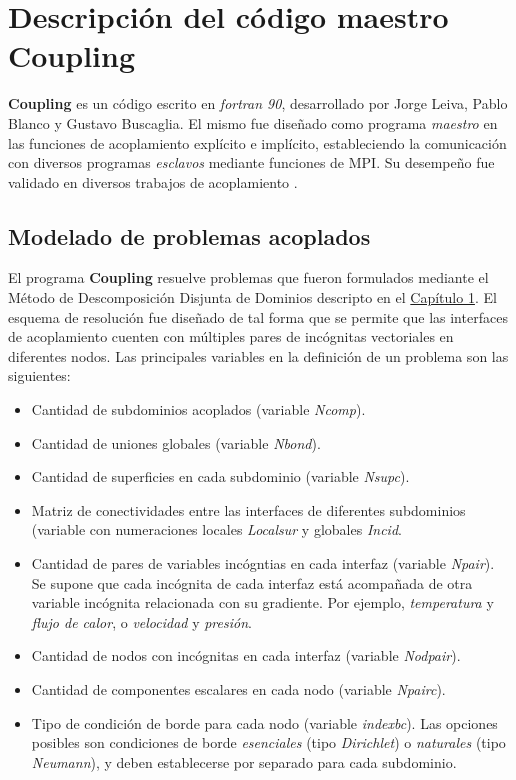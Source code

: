 \chapter{Descripción del código maestro \textbf{Coupling}}
\label{C:coupling}

\textbf{Coupling} es un código escrito en \textit{fortran 90}, desarrollado por Jorge Leiva, Pablo Blanco y Gustavo Buscaglia.
El mismo fue diseñado como programa \textit{maestro} en las funciones de acoplamiento explícito e implícito,
estableciendo la comunicación con diversos programas \textit{esclavos} mediante funciones de MPI.
Su desempeño fue validado en diversos trabajos de acoplamiento \cite{coup-0d3d} \cite{coup-black} \cite{coup-hyd} \cite{coup-strong}.

\section{Modelado de problemas acoplados}
\label{ap1:definicion}
El programa \textbf{Coupling} resuelve problemas que fueron formulados mediante el Método de Descomposición Disjunta de Dominios descripto en el \hyperlink{chapter.1}{Capítulo 1}.
El esquema de resolución fue diseñado de tal forma que se permite que las interfaces de acoplamiento cuenten con múltiples pares de incógnitas vectoriales en diferentes nodos.
Las principales variables en la definición de un problema son las siguientes:
\begin{itemize}
\item Cantidad de subdominios acoplados (variable \textit{Ncomp}).
\item Cantidad de uniones globales (variable \textit{Nbond}).
\item Cantidad de superficies en cada subdominio (variable \textit{Nsupc}).
\item Matriz de conectividades entre las interfaces de diferentes subdominios (variable con numeraciones locales \textit{Localsur} y globales \textit{Incid}.
\item Cantidad de pares de variables incógntias en cada interfaz (variable \textit{Npair}).
Se supone que cada incógnita de cada interfaz está acompañada de otra variable incógnita relacionada con su gradiente.
Por ejemplo, \textit{temperatura} y \textit{flujo de calor}, o \textit{velocidad} y \textit{presión}.
\item Cantidad de nodos con incógnitas en cada interfaz (variable \textit{Nodpair}).
\item Cantidad de componentes escalares en cada nodo (variable \textit{Npairc}).
\item Tipo de condición de borde para cada nodo (variable \textit{indexbc}).
Las opciones posibles son condiciones de borde \textit{esenciales} (tipo \textit{Dirichlet}) o \textit{naturales} (tipo \textit{Neumann}), y deben establecerse por separado para cada subdominio.
\end{itemize}
